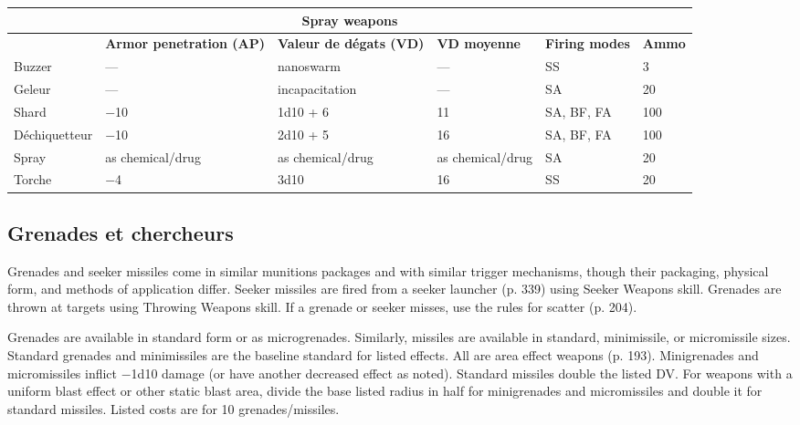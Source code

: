 {{\begin{table} \begin{tabularx}{\textwidth}{|l|X|l|l|l|l|} \hline

\multicolumn{6}{|c|}{\textbf{Spray weapons}} \\ \hline

&\textbf{Armor penetration (AP)}	&\textbf{Valeur de dégats (VD)}	&\textbf{VD moyenne}	&\textbf{Firing modes}	&\textbf{Ammo} \\ \hline

Buzzer	&--- &nanoswarm	&--- &SS	&3 \\ \hline

Geleur	&--- &incapacitation	&--- &SA	&20 \\ \hline

Shard	&$-$10	&1d10 + 6	&11	&SA, BF, FA	&100 \\ \hline

Déchiquetteur	&$-$10	&2d10 + 5	&16	&SA, BF, FA	&100 \\ \hline

Spray	&as chemical/drug	&as chemical/drug	&as chemical/drug	&SA	&20 \\ \hline

Torche	&$-$4	&3d10	&16	&SS	&20 \\ \hline

\end{tabularx} \label{tab:spray-weapons} \end{table} 

\subsection{Grenades et chercheurs} \label{sec:grenades-seekers} 

Grenades and seeker missiles come in similar munitions packages and with similar trigger mechanisms, though their packaging, physical form, and methods of application differ. Seeker missiles are fired from a seeker launcher (p. 339) using Seeker Weapons skill. Grenades are thrown at targets using Throwing Weapons skill. If a grenade or seeker misses, use the rules for scatter (p. 204). 

Grenades are available in standard form or as microgrenades. Similarly, missiles are available in standard, minimissile, or micromissile sizes. Standard grenades and minimissiles are the baseline standard for listed effects. All are area effect weapons (p. 193). Minigrenades and micromissiles inflict $-$1d10 damage (or have another decreased effect as noted). Standard missiles double the listed DV. For weapons with a uniform blast effect or other static blast area, divide the base listed radius in half for minigrenades and micromissiles and double it for standard missiles. Listed costs are for 10 grenades/missiles. 

}}
